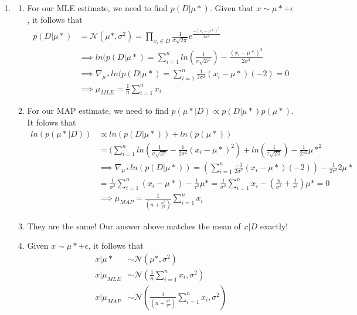 \documentclass[submit]{harvardml}
\begin{document}
\begin{enumerate}
    \item 
    \begin{enumerate}
        \item For our MLE estimate, we need to find $p(D | \mu*)$. Given that $x \sim \mu* + \epsilon$, it follows that 
        \begin{align}
            p(D | \mu*) &= \mathcal{N}(\mu*, \sigma^2) = \prod_{x_i \in D} \frac{1}{\sigma \sqrt{2 \pi}} e^{\frac{-(x_i - \mu*)^2}{2\sigma^2}} \\
            & \implies ln(p(D | \mu*) = \sum_{i=1}^n ln(\frac{1}{\sigma \sqrt{2 \pi}}) - \frac{(x_i - \mu*)^2}{2\sigma^2} \\
            & \implies \nabla_{\mu*} ln(p(D | \mu*) = \sum_{i=1}^n \frac{1}{2\sigma^2}(x_i - \mu*) (-2) = 0 \\
            &\implies \mu_{MLE} = \frac{1}{n}\sum_{i=1}^n x_i
        \end{align}
        \item For our MAP estimate, we need to find $p(\mu* | D) \propto p(D|\mu*) p(\mu*)$. It folows that 
        \begin{align}
            ln(p(\mu* | D)) &\propto ln(p(D| \mu*)) + ln(p(\mu*)) \\
            & = (\sum_{i=1}^n ln(\frac{1}{\sigma \sqrt{2 \pi}} - \frac{1}{2\sigma^2}(x_i - \mu*)^2) + ln(\frac{1}{\tau \sqrt{2 \pi}}) - \frac{1}{2\tau^2}\mu*^2 \\
                &\implies \nabla_{\mu*}ln(p(D|\mu*)) = (\sum_{i=1}^n \frac{-1}{2\sigma^2} (x_i - \mu*)(-2)) - \frac{1}{2\tau^2}2\mu* \\
                &= \frac{1}{\sigma^2} \sum_{i=1}^n (x_i - \mu*) - \frac{1}{\tau^2}\mu* =  \frac{1}{\sigma^2} \sum_{i=1}^n x_i - (\frac{n}{\sigma^2} + \frac{1}{\tau^2})\mu* = 0 \\
                &\implies \mu_{MAP} = \frac{1}{(n + \frac{\sigma^2}{\tau^2})} \sum_{i=1}^n x_i
        \end{align}
        \item They are the same! Our answer above matches the mean of $x|D$ exactly! 
        \item Given $ x \sim \mu* + \epsilon$, it follows that
        \begin{align}
            x | \mu* &\sim \mathcal{N}(\mu*, \sigma^2) \\
            x|\mu_{MLE} &\sim  \mathcal{N}(\frac{1}{n} \sum_{i=1}^n x_i, \sigma^2)\\
            x| \mu_{MAP} &\sim \mathcal{N}(\frac{1}{(n + \frac{\sigma^2}{\tau^2})} \sum_{i=1}^n x_i, \sigma^2)
        \end{align}
        

\end{enumerate}
\end{enumerate}
\end{document}
